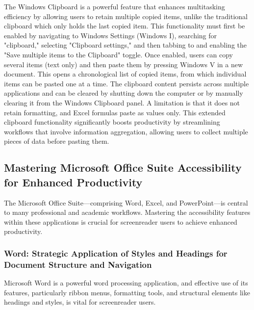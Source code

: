 The Windows Clipboard is a powerful feature that enhances multitasking efficiency by allowing users to retain multiple copied items, unlike the traditional clipboard which only holds the last copied item.\supercite{kingsbury2025} This functionality must first be enabled by navigating to Windows Settings (Windows I), searching for "clipboard," selecting "Clipboard settings," and then tabbing to and enabling the "Save multiple items to the Clipboard" toggle.\supercite{kingsbury2025} Once enabled, users can copy several items (text only) and then paste them by pressing Windows V in a new document. This opens a chronological list of copied items, from which individual items can be pasted one at a time.\supercite{kingsbury2025} The clipboard content persists across multiple applications and can be cleared by shutting down the computer or by manually clearing it from the Windows Clipboard panel.\supercite{kingsbury2025} A limitation is that it does not retain formatting, and Excel formulas paste as values only.\supercite{kingsbury2025} This extended clipboard functionality significantly boosts productivity by streamlining workflows that involve information aggregation, allowing users to collect multiple pieces of data before pasting them.

\subsection{Mastering Microsoft Office Suite Accessibility for Enhanced Productivity}
The Microsoft Office Suite—comprising Word, Excel, and PowerPoint—is central to many professional and academic workflows. Mastering the accessibility features within these applications is crucial for screenreader users to achieve enhanced productivity.

\subsubsection{Word: Strategic Application of Styles and Headings for Document Structure and Navigation}
Microsoft Word is a powerful word processing application, and effective use of its features, particularly ribbon menus, formatting tools, and structural elements like headings and styles, is vital for screenreader users.
